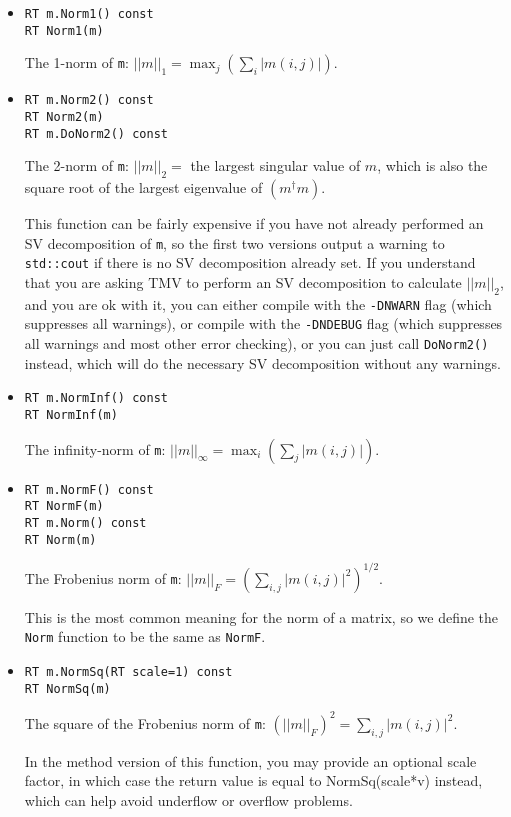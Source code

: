 \documentclass[twoside,letterpaper,11pt]{article}
\renewcommand{\tt}[1]{{\texttt {#1}}}
\begin{document}
\begin{itemize}

\item
\begin{verbatim}
RT m.Norm1() const
RT Norm1(m)
\end{verbatim}
The 1-norm of \tt{m}: 
$||m||_1 = \max_j (\sum_i |m(i,j)|)$.

\item
\begin{verbatim}
RT m.Norm2() const
RT Norm2(m)
RT m.DoNorm2() const
\end{verbatim}
The 2-norm of \tt{m}: $||m||_2 =$ the largest singular value of $m$, which
is also the square root of the largest eigenvalue of $(m^\dagger m)$.

This function can be fairly expensive if you have not
already performed an SV decomposition of \tt{m}, so the first two versions
output a warning to \tt{std::cout} if there is no SV decomposition already set.
If you understand that you are asking TMV to perform an SV decomposition
to calculate $||m||_2$, and you are ok with it, you can either compile with
the \tt{-DNWARN} flag (which suppresses all warnings), or compile with
the \tt{-DNDEBUG} flag (which suppresses all warnings and most other
error checking), or you can just call \tt{DoNorm2()} instead, which will do the 
necessary SV decomposition without any warnings.

\item
\begin{verbatim}
RT m.NormInf() const
RT NormInf(m)
\end{verbatim}
The infinity-norm of \tt{m}: 
$||m||_\infty = \max_i (\sum_j |m(i,j)|)$.

\item
\begin{verbatim}
RT m.NormF() const
RT NormF(m)
RT m.Norm() const
RT Norm(m)
\end{verbatim}
The Frobenius norm of \tt{m}: 
$||m||_F = (\sum_{i,j} |m(i,j)|^2)^{1/2}$.

This is the most common meaning for the norm of a matrix, so we
define the \tt{Norm} function to be the same as \tt{NormF}.

\item
\begin{verbatim}
RT m.NormSq(RT scale=1) const
RT NormSq(m)
\end{verbatim}
The square of the Frobenius norm of \tt{m}: 
$(||m||_F)^2 = \sum_{i,j} |m(i,j)|^2$.

In the method version of this function, you may provide an optional scale factor,
in which case the return value is equal to NormSq(scale*v) instead, 
which can help avoid underflow or overflow problems.


\end{itemize}
\end{document}
